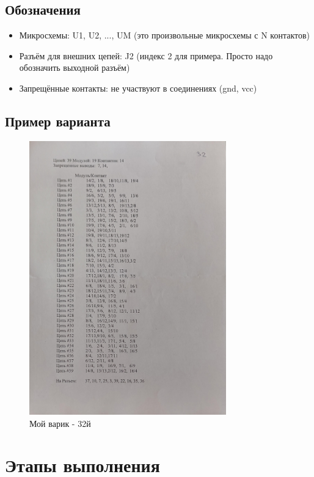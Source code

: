\documentclass[a4paper, 12pt]{article}
\begin{document}
\subsection{Обозначения}
\begin{itemize}
	\item Микросхемы: U1, U2, ..., UM (это произвольные микросхемы с N контактов)
	\item Разъём для внешних цепей: J2 (индекс 2 для примера. Просто надо обозначить выходной разъём)
	\item Запрещённые контакты: не участвуют в соединениях (gnd, vcc)
\end{itemize}

\subsection{Пример варианта}
\begin{figure}[h!]
	\centering
	\includegraphics[width=0.76\textwidth]{docs/hw_ex.jpg}
	\caption{Мой варик - 32й}
\end{figure}

\section{Этапы выполнения}
\end{document}
